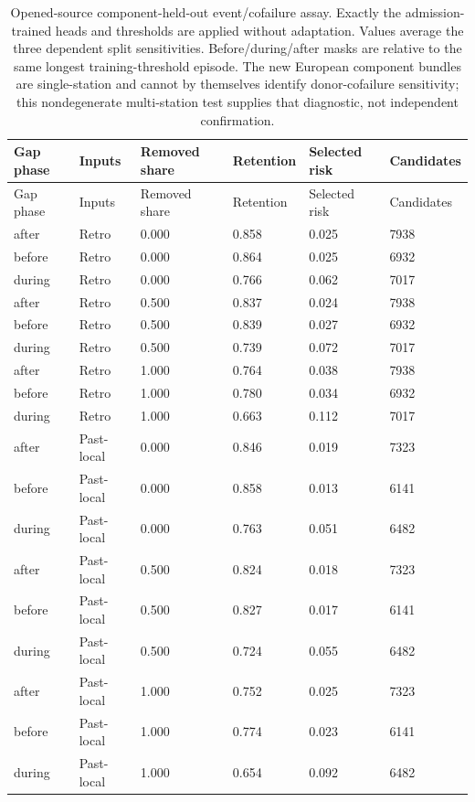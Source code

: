 {\tabletext
\setlength{\tabcolsep}{3pt}
\begin{longtable}{p{}p{}p{}p{}p{}p{}}
\caption{Opened-source component-held-out event/cofailure assay. Exactly the admission-trained heads and thresholds are applied without adaptation. Values average the three dependent split sensitivities. Before/during/after masks are relative to the same longest training-threshold episode. The new European component bundles are single-station and cannot by themselves identify donor-cofailure sensitivity; this nondegenerate multi-station test supplies that diagnostic, not independent confirmation.}\label{tab:r3si-event_cofailure}\\
\toprule
Gap phase & Inputs & Removed share & Retention & Selected risk & Candidates \\
\midrule
\endfirsthead
\toprule
Gap phase & Inputs & Removed share & Retention & Selected risk & Candidates \\
\midrule
\endhead
after & Retro & 0.000 & 0.858 & 0.025 & 7938 \\
before & Retro & 0.000 & 0.864 & 0.025 & 6932 \\
during & Retro & 0.000 & 0.766 & 0.062 & 7017 \\
after & Retro & 0.500 & 0.837 & 0.024 & 7938 \\
before & Retro & 0.500 & 0.839 & 0.027 & 6932 \\
during & Retro & 0.500 & 0.739 & 0.072 & 7017 \\
after & Retro & 1.000 & 0.764 & 0.038 & 7938 \\
before & Retro & 1.000 & 0.780 & 0.034 & 6932 \\
during & Retro & 1.000 & 0.663 & 0.112 & 7017 \\
after & Past-local & 0.000 & 0.846 & 0.019 & 7323 \\
before & Past-local & 0.000 & 0.858 & 0.013 & 6141 \\
during & Past-local & 0.000 & 0.763 & 0.051 & 6482 \\
after & Past-local & 0.500 & 0.824 & 0.018 & 7323 \\
before & Past-local & 0.500 & 0.827 & 0.017 & 6141 \\
during & Past-local & 0.500 & 0.724 & 0.055 & 6482 \\
after & Past-local & 1.000 & 0.752 & 0.025 & 7323 \\
before & Past-local & 1.000 & 0.774 & 0.023 & 6141 \\
during & Past-local & 1.000 & 0.654 & 0.092 & 6482 \\
\bottomrule
\end{longtable}
}

